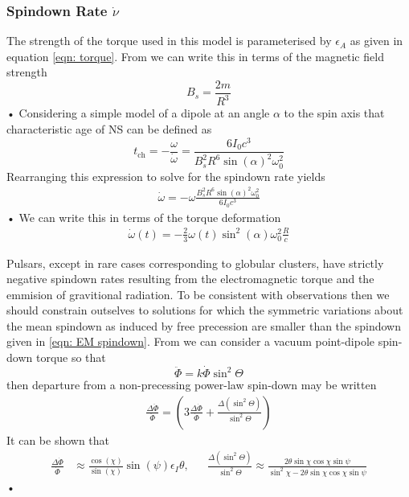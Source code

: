 \documentclass[/home/greg/Thesis/main/main.tex]{subfiles}
\begin{document}
\FloatBarrier
\subsubsection{Spindown Rate $\dot{\nu}$}
The strength of the torque used in this model is parameterised by $\epsilon_{A}$ as given
in equation \eqref{eqn: torque}. From \citet{Shapiro83} we can write this in terms of the
magnetic field strength 
\begin{equation}
B_{s} = \frac{2m}{R^{3}}
\end{equation}•
Considering a simple model of a dipole at an angle $\alpha$ to the spin axis that characteristic
age of NS can be defined as
\begin{equation}
t_{\textrm{ch}} = -\frac{\omega}{\dot{\omega}} = \frac{6 I_{0} c^{3}}{B_{s}^{2}R^{6} \sin(\alpha)^{2}\omega_{0}^{2}}
\end{equation}
Rearranging this expression to solve for the spindown rate yields
\begin{align}
\dot\omega = - \omega \frac{B_{s}^{2}R^{6} \sin(\alpha)^{2}\omega_{0}^{2}}{6I_{0}c^{3}}
\end{align}•
We can write this in terms of the torque deformation
\begin{align}
\dot\omega(t) = - \frac{2}{3}\omega(t) \sin^{2}(\alpha) \omega_{0}^{2} \frac{R}{c}
\label{eqn: EM spindown}
\end{align}

Pulsars, except in rare cases corresponding to globular clusters, have strictly 
negative spindown rates resulting from the electromagnetic torque and 
the emmision of gravitional radiation. To be consistent with observations then
we should constrain outselves to solutions for which the symmetric variations
about the mean spindown as induced by free precession are smaller than the 
spindown given in \eqref{eqn: EM spindown}. From \citet{Jones2001} we can
consider a vacuum point-dipole spin-down torque so that
\begin{equation}
\ddot{\Phi} = k \dot{\Phi} \sin^{2}\Theta
\end{equation}
then departure from a non-precessing power-law spin-down may be written
\begin{align}
\frac{\Delta\ddot{\Phi}}{\ddot{\Phi}} = \left(3 \frac{\Delta\dot{\Phi}}{\dot{\Phi}} + \frac{\Delta(\sin^{2}\Theta)}{\sin^{2}\Theta}\right)
\end{align}
It can be shown that 
\begin{align}
\frac{\Delta\dot{\Phi}}{\dot{\Phi}} & \approx \frac{\cos(\chi)}{\sin(\chi)}\sin(\psi) \epsilon_{I}\theta, &&
\frac{\Delta(\sin^{2}\Theta)}{\sin^{2}\Theta} \approx \frac{2\theta\sin\chi\cos\chi\sin\psi}{\sin^{2}\chi - 2\theta\sin\chi\cos\chi\sin\psi}
\end{align}•
\end{document}
